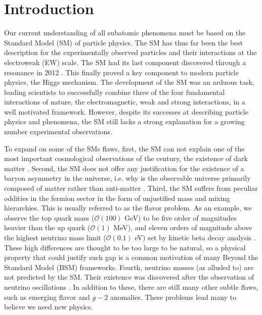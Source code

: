 \documentclass[10pt]{report}
\begin{document}
\cleardoublepage

\setcounter{page}{1}


\begingroup
\let\clearpage\relax

\chapter{Introduction}
\label{Chap:Introduction}

Our current understanding of all subatomic phenomena must be based on the Standard Model (SM) of particle physics. The SM has thus far been the best description for the experimentally observed particles and their interactions at the electroweak (EW) scale. The SM had its last component discovered through a resonance in 2012 \cite{collaborations2016measurements}. This finally proved a key component to modern particle physics, the Higgs mechanism.  The development of the SM was an arduous task, leading scientists to successfully combine three of the four fundamental interactions of nature, the electromagnetic, weak and strong interactions, in a well motivated framework. However, despite its successes at describing particle physics and phenomena, the SM still lacks a strong explanation for a growing number experimental observations. 

To expand on some of the SMs flaws, first, the SM can not explain one of the most important cosmological observations of the century, the existence of dark matter \cite{Bergstr_m_2000}. Second, the SM does not offer any justification for the existence of a baryon asymmetry in the universe, i.e. why is the observable universe primarily composed of matter rather than anti-matter \cite{book_Baryion}. Third, the SM suffers from peculiar oddities in the fermion sector in the form of unjustified mass and mixing hierarchies. This is usually referred to as the flavor problem. As an example, we observe the top quark mass ($\mathcal{O}(100)$ GeV) to be five order of magnitudes heavier than the up quark ($\mathcal{O}(1)$ MeV), and eleven orders of magnitude above the highest neutrino mass limit ($\mathcal{O}(0.1)$ eV) set by kinetic beta decay analysis \cite{Mertens_2016}. These high differences are thought to be too large to be natural, so a physical property that could justify such gap is a common motivation of many Beyond the Standard Model (BSM) frameworks. Fourth, neutrino masses (as alluded to) are not predicted by the SM. Their existence was discovered after the observation of neutrino oscillations \cite{PhysRevD.89.013001}. In addition to these, there are still many other subtle flaws, such as emerging flavor and $g-2$ anomalies. These problems lead many to believe we need new physics. 
\end{document}
